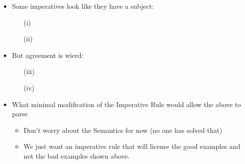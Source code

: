 \documentclass[a4paper,landscape,headrule,footrule]{foils}
\begin{document}


\begin{itemize}
\item Some imperatives look like they have a subject:
  \begin{itemize}
  \item[(i)] 
  \item[(ii)] 
  \end{itemize}
\item But agreement is wierd:
  \begin{itemize}
  \item[(iii)] 
  \item[(iv)]
  \end{itemize}
\item What minimal modification of the Imperative Rule would allow the above to parse
  \begin{itemize}
  \item Don't worry about the Semantics for now (no one has solved that)
  \item We just want an imperative rule that will license the good examples and not the bad examples shown above.
    
  \end{itemize}


  
\end{itemize}
\end{document}
